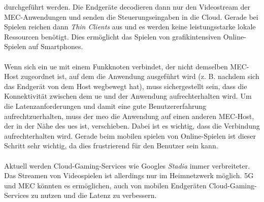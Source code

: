 \documentclass[runningheads]{llncs}
\numberwithin{figure}{section}
\begin{document}
durchgeführt werden. Die Endgeräte decodieren dann nur den Videostream der MEC-Anwendungen und senden die Steuerungseingaben in die Cloud.
Gerade bei Spielen reichen dann \textit{Thin Clients} aus und es werden keine leistungsstarke lokale Ressourcen benötigt. 
Dies ermöglicht das Spielen von grafikintensiven Online-Spielen auf Smartphones. \cite{chinamobileztePoweredSA5G}
\\
\\
Wenn sich ein \acrshort{ue} mit einem Funkknoten verbindet, der nicht demselben MEC-Host zugeordnet ist, 
auf dem die Anwendung ausgeführt wird (z. B. nachdem sich das Endgerät von dem Host wegbewegt hat), 
muss sichergestellt sein, dass die Konnektivität zwischen dem \acrshort{ue} und der Anwendung aufrechterhalten wird. 
Um die Latenzanforderungen und damit eine gute Benutzererfahrung aufrechtzuerhalten, 
muss der \acrshort{meo} die Anwendung auf einen anderen MEC-Host, der in der Nähe des \acrshort{ue}s ist, verschieben. 
Dabei ist es wichtig, dass die Verbindung aufrechterhalten wird. Gerade beim mobilen spielen von Online-Spielen
ist dieser Schritt sehr wichtig, da dies frustrierend für den Benutzer sein kann. \cite{etsiETSIGSMEC} 
\\
\\
Aktuell werden Cloud-Gaming-Services wie Googles \textit{Stadia} immer verbreiteter. Das Streamen von Videospielen ist
allerdings nur im Heimnetzwerk möglich. 5G und MEC könnten es ermöglichen, auch von mobilen Endgeräten Cloud-Gaming-Services zu nutzen
und die Latenz zu verbessern. \cite{etsiMultiaccessEdgeComputing}
\end{document}
